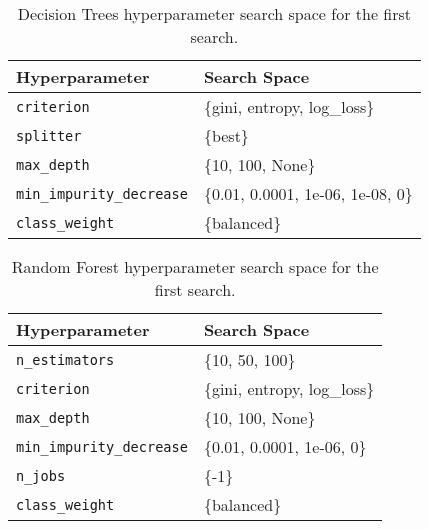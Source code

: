\begin{table}[H]
\centering
\begin{tabularx}{0.48\textwidth}{|l|X|}
\hline
Hyperparameter & Search Space \\
\hline
\texttt{criterion} & \{gini, entropy, log\_loss\} \\
\texttt{splitter} & \{best\} \\
\texttt{max\_depth} & \{10, 100, None\} \\
\texttt{min\_impurity\_decrease} & \{0.01, 0.0001, 1e-06, 1e-08, 0\} \\
\texttt{class\_weight} & \{balanced\} \\
\hline
\end{tabularx}
\caption{Decision Trees hyperparameter search space for the first search.}
\label{tab:hyperparameters_decision_tree_0}

\end{table}


\begin{table}[H]
\centering
\begin{tabularx}{0.48\textwidth}{|l|X|}
\hline
Hyperparameter & Search Space \\
\hline
\texttt{n\_estimators} & \{10, 50, 100\} \\
\texttt{criterion} & \{gini, entropy, log\_loss\} \\
\texttt{max\_depth} & \{10, 100, None\} \\
\texttt{min\_impurity\_decrease} & \{0.01, 0.0001, 1e-06, 0\} \\
\texttt{n\_jobs} & \{-1\} \\
\texttt{class\_weight} & \{balanced\} \\
\hline
\end{tabularx}
\caption{Random Forest hyperparameter search space for the first search.}
\label{tab:hyperparameters_random_forest_0}

\end{table}



